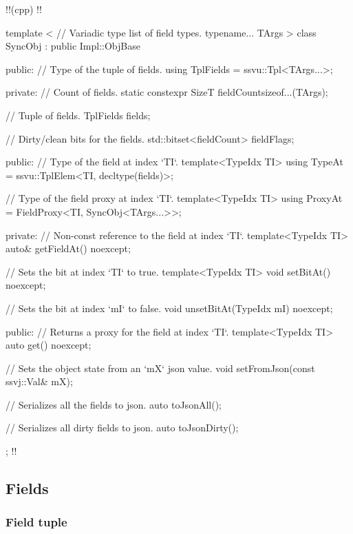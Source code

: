 \documentclass{report}
\begin{document}
!!(cpp)
!!{
    template
    <
        // Variadic type list of field types.
        typename... TArgs
    > 
    class SyncObj : public Impl::ObjBase
    {
        public:
            // Type of the tuple of fields.
            using TplFields = ssvu::Tpl<TArgs...>;

        private:
            // Count of fields.
            static constexpr SizeT fieldCount{sizeof...(TArgs)};

            // Tuple of fields.
            TplFields fields;

            // Dirty/clean bits for the fields.
            std::bitset<fieldCount> fieldFlags;

        public:
            // Type of the field at index `TI`.
            template<TypeIdx TI> using TypeAt = ssvu::TplElem<TI, decltype(fields)>;

            // Type of the field proxy at index `TI`.
            template<TypeIdx TI> using ProxyAt = FieldProxy<TI, SyncObj<TArgs...>>;

        private:
            // Non-const reference to the field at index `TI`.
            template<TypeIdx TI> auto& getFieldAt() noexcept;

            // Sets the bit at index `TI` to true.
            template<TypeIdx TI> void setBitAt() noexcept;

            // Sets the bit at index `mI` to false.
            void unsetBitAt(TypeIdx mI) noexcept;

        public:
            // Returns a proxy for the field at index `TI`.
            template<TypeIdx TI> auto get() noexcept;

            // Sets the object state from an `mX` json value.
            void setFromJson(const ssvj::Val& mX);

            // Serializes all the fields to json.
            auto toJsonAll();

            // Serializes all dirty fields to json.
            auto toJsonDirty();
    };
!!}

            \subsection{Fields}                

                \subsubsection{Field tuple}
\end{document}
